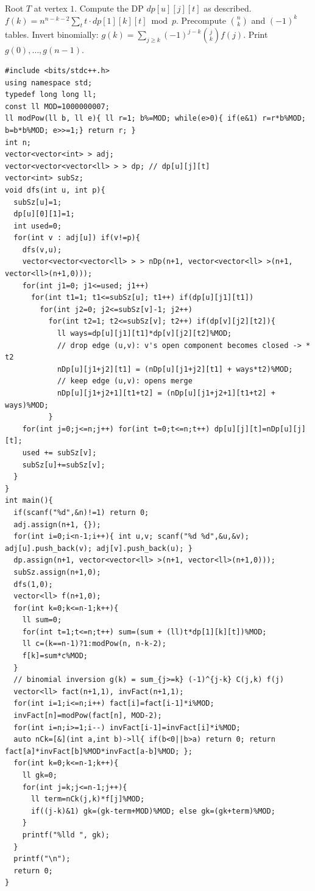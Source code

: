 Root \(T\) at vertex \(1\).  Compute the DP \(dp[u][j][t]\) as described.
\(f(k)=n^{n-k-2}\sum_t t\cdot dp[1][k][t]\bmod p\).  Precompute \(\binom{n}{k}\)
and \((-1)^k\) tables.  Invert binomially: \(g(k)=\sum_{j\ge k}(-1)^{j-k
}\binom{j}{k}f(j)\).  Print \(g(0),\dots,g(n-1)\).

\begin{lstlisting}[caption={CF 917D. Tree DP with state (edges kept, open size) then binomial inversion. Handles the k=n-1 case by special-casing the negative exponent via modPow with MOD minus 2. ASCII only, identifiers without underscores}, label={lst:c32-summit}]
#include <bits/stdc++.h>
using namespace std;
typedef long long ll;
const ll MOD=1000000007;
ll modPow(ll b, ll e){ ll r=1; b%=MOD; while(e>0){ if(e&1) r=r*b%MOD; b=b*b%MOD; e>>=1;} return r; }
int n;
vector<vector<int> > adj;
vector<vector<vector<ll> > > dp; // dp[u][j][t]
vector<int> subSz;
void dfs(int u, int p){
  subSz[u]=1;
  dp[u][0][1]=1;
  int used=0;
  for(int v : adj[u]) if(v!=p){
    dfs(v,u);
    vector<vector<vector<ll> > > nDp(n+1, vector<vector<ll> >(n+1, vector<ll>(n+1,0)));
    for(int j1=0; j1<=used; j1++)
      for(int t1=1; t1<=subSz[u]; t1++) if(dp[u][j1][t1])
        for(int j2=0; j2<=subSz[v]-1; j2++)
          for(int t2=1; t2<=subSz[v]; t2++) if(dp[v][j2][t2]){
            ll ways=dp[u][j1][t1]*dp[v][j2][t2]%MOD;
            // drop edge (u,v): v's open component becomes closed -> * t2
            nDp[u][j1+j2][t1] = (nDp[u][j1+j2][t1] + ways*t2)%MOD;
            // keep edge (u,v): opens merge
            nDp[u][j1+j2+1][t1+t2] = (nDp[u][j1+j2+1][t1+t2] + ways)%MOD;
          }
    for(int j=0;j<=n;j++) for(int t=0;t<=n;t++) dp[u][j][t]=nDp[u][j][t];
    used += subSz[v];
    subSz[u]+=subSz[v];
  }
}
int main(){
  if(scanf("%d",&n)!=1) return 0;
  adj.assign(n+1, {});
  for(int i=0;i<n-1;i++){ int u,v; scanf("%d %d",&u,&v); adj[u].push_back(v); adj[v].push_back(u); }
  dp.assign(n+1, vector<vector<ll> >(n+1, vector<ll>(n+1,0)));
  subSz.assign(n+1,0);
  dfs(1,0);
  vector<ll> f(n+1,0);
  for(int k=0;k<=n-1;k++){
    ll sum=0;
    for(int t=1;t<=n;t++) sum=(sum + (ll)t*dp[1][k][t])%MOD;
    ll c=(k==n-1)?1:modPow(n, n-k-2);
    f[k]=sum*c%MOD;
  }
  // binomial inversion g(k) = sum_{j>=k} (-1)^{j-k} C(j,k) f(j)
  vector<ll> fact(n+1,1), invFact(n+1,1);
  for(int i=1;i<=n;i++) fact[i]=fact[i-1]*i%MOD;
  invFact[n]=modPow(fact[n], MOD-2);
  for(int i=n;i>=1;i--) invFact[i-1]=invFact[i]*i%MOD;
  auto nCk=[&](int a,int b)->ll{ if(b<0||b>a) return 0; return fact[a]*invFact[b]%MOD*invFact[a-b]%MOD; };
  for(int k=0;k<=n-1;k++){
    ll gk=0;
    for(int j=k;j<=n-1;j++){
      ll term=nCk(j,k)*f[j]%MOD;
      if((j-k)&1) gk=(gk-term+MOD)%MOD; else gk=(gk+term)%MOD;
    }
    printf("%lld ", gk);
  }
  printf("\n");
  return 0;
}
\end{lstlisting}

